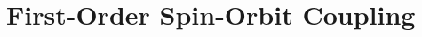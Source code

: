 \documentclass[10pt]{report}
\numberwithin{equation}{section}
\begin{document}
\section{First-Order Spin-Orbit Coupling}
\end{document}
